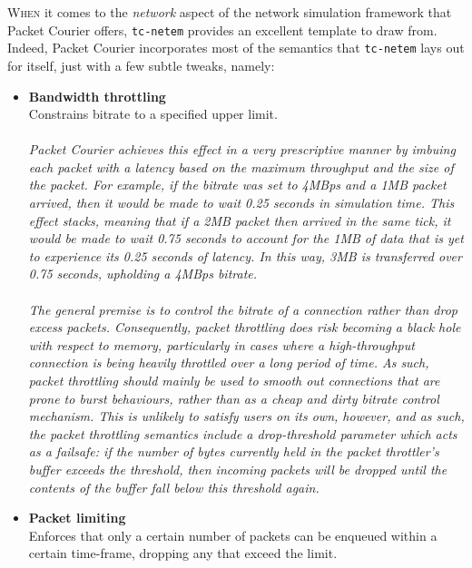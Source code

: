 \lettrine{W}{hen} it comes to the \emph{network} aspect of the network simulation framework that Packet Courier offers,
\texttt{tc-netem}\cite{tc_netem_wiki, tc_netem_8_man,tc_netem_src} provides an excellent template to draw from.
Indeed, Packet Courier incorporates most of the semantics that \texttt{tc-netem} lays out for itself, just with a few
subtle tweaks, namely:
\begin{itemize}
    \item \textbf{Bandwidth throttling} \\
    Constrains bitrate to a specified upper limit. \\ \\
    \emph{Packet Courier achieves this effect in a very prescriptive manner by imbuing each packet with a latency
    based on the maximum throughput and the size of the packet. For example, if the bitrate was set to 4MBps and a
    1MB packet arrived, then it would be made to wait 0.25 seconds in simulation time. This effect stacks, meaning
    that if a 2MB packet then arrived in the same tick, it would be made to wait 0.75 seconds to account for the 1MB
    of data that is yet to experience its 0.25 seconds of latency. In this way, 3MB is transferred over 0.75 seconds,
        upholding a 4MBps bitrate. \\ \\
        The general premise is to control the bitrate of a connection rather than drop excess packets. Consequently,
        packet throttling does risk becoming a black hole with respect to memory, particularly in cases where a
        high-throughput connection is being heavily throttled over a long period of time. As such, packet throttling
        should mainly be used to smooth out connections that are prone to burst behaviours, rather than as a cheap
        and dirty bitrate control mechanism. This is unlikely to satisfy users on its own, however, and as such, the
        packet throttling semantics include a drop-threshold parameter which acts as a failsafe: if the number of
        bytes currently held in the packet throttler's buffer exceeds the threshold, then incoming packets will be
        dropped until the contents of the buffer fall below this threshold again.}
    \item \textbf{Packet limiting} \\
    Enforces that only a certain number of packets can be enqueued within a certain time-frame, dropping any that
    exceed the limit. \\ \\

\end{itemize}
